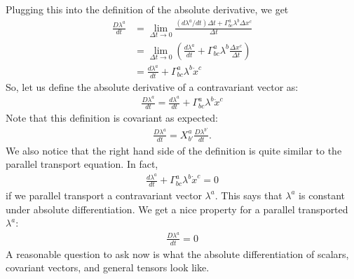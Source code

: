\documentclass{article}
\theoremstyle{definition}
\begin{document}
Plugging this into the definition of the absolute derivative, we get
\begin{align*}
\frac{D\lambda^a}{dt} &= \lim\limits_{\Delta t \rightarrow 0}\frac{(d\lambda^a/dt)\Delta t + \Gamma^a_{bc}\lambda^b\Delta x^c}{\Delta t}\\
&= \lim\limits_{\Delta t \rightarrow 0}\left( \frac{d\lambda^a}{dt} + \Gamma^a_{bc}\lambda^b\frac{\Delta x^c}{\Delta t} \right)\\
&= \frac{d\lambda^a}{dt} + \Gamma^a_{bc}\lambda^b\dot{x}^c 
\end{align*}
So, let us define the absolute derivative of a contravariant vector as:
\begin{align*}
\boxed{\frac{D\lambda^a}{dt} = \frac{d\lambda^a}{dt} + \Gamma^a_{bc}\lambda^b\dot{x}^c}
\end{align*}
Note that this definition is covariant as expected:
\begin{align*}
\frac{D\lambda^a}{dt} = X^{a}_{b'}\frac{D\lambda^{b'}}{dt}.
\end{align*}
We also notice that the right hand side of the definition is quite similar to the parallel transport equation. In fact, 
\begin{align*}
\frac{d\lambda^a}{dt} + \Gamma^a_{bc}\lambda^b\dot{x}^c = 0
\end{align*}
if we parallel transport a contravariant vector $\lambda^a$. This says that $\lambda^a$ is constant under absolute differentiation. We get a nice property for a parallel transported $\lambda^a$:
\begin{align*}
\boxed{\frac{D\lambda^a}{dt} = 0}
\end{align*}
A reasonable question to ask now is what the absolute differentiation of scalars, covariant vectors, and general tensors look like. \\
\end{document}
